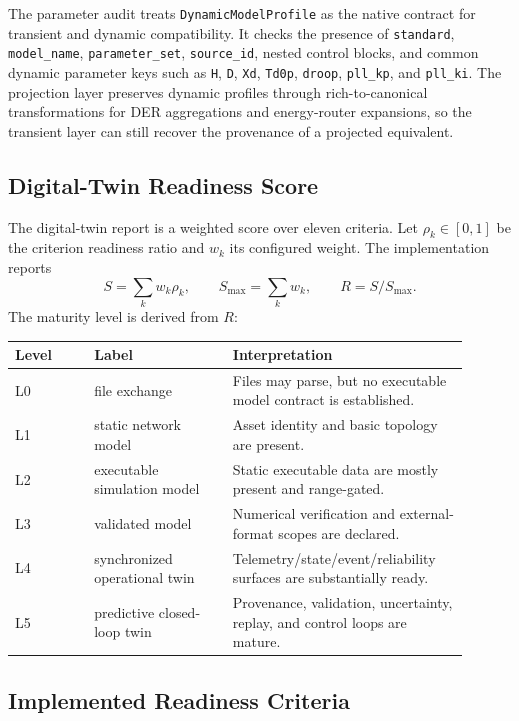 The parameter audit treats \texttt{DynamicModelProfile} as the native contract
for transient and dynamic compatibility.  It checks the presence of
\texttt{standard}, \texttt{model\_name}, \texttt{parameter\_set},
\texttt{source\_id}, nested control blocks, and common dynamic parameter keys
such as \texttt{H}, \texttt{D}, \texttt{Xd}, \texttt{Td0p}, \texttt{droop},
\texttt{pll\_kp}, and \texttt{pll\_ki}.  The projection layer preserves dynamic
profiles through rich-to-canonical transformations for DER aggregations and
energy-router expansions, so the transient layer can still recover the
provenance of a projected equivalent.

\subsection{Digital-Twin Readiness Score}

The digital-twin report is a weighted score over eleven criteria.  Let
\(\rho_k\in[0,1]\) be the criterion readiness ratio and \(w_k\) its configured
weight.  The implementation reports
\[
  S = \sum_k w_k\rho_k,\qquad
  S_{\max} = \sum_k w_k,\qquad
  R = S/S_{\max}.
\]
The maturity level is derived from \(R\):

\begin{longtable}{L{0.16\linewidth}L{0.28\linewidth}L{0.46\linewidth}}
\toprule
Level & Label & Interpretation \\
\midrule
\endhead
L0 & file exchange & Files may parse, but no executable model contract is established. \\
L1 & static network model & Asset identity and basic topology are present. \\
L2 & executable simulation model & Static executable data are mostly present and range-gated. \\
L3 & validated model & Numerical verification and external-format scopes are declared. \\
L4 & synchronized operational twin & Telemetry/state/event/reliability surfaces are substantially ready. \\
L5 & predictive closed-loop twin & Provenance, validation, uncertainty, replay, and control loops are mature. \\
\bottomrule
\end{longtable}

\subsection{Implemented Readiness Criteria}

